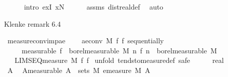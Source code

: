 \begin{isabellebody}
\ \ \ \ \isamarkupfalse%
\ {\isacharparenleft}{\kern0pt}intro\ exI{\isacharbrackleft}{\kern0pt}\ x{\isacharequal}{\kern0pt}N{\isacharbrackright}{\kern0pt}{\isacharparenright}{\kern0pt}\isanewline
\ \ \ \ \isamarkupfalse%
\ assms{\isacharparenleft}{\kern0pt}{}{\isacharparenright}{\kern0pt}\ dist{\isacharunderscore}{\kern0pt}real{\isacharunderscore}{\kern0pt}def\ \isamarkupfalse%
\ auto\isanewline
{}\isamarkupfalse%
%
\endisatagproof
{\isafoldproof}%
%
\isadelimproof
%
\endisadelimproof
%
\begin{isamarkuptext}%
Klenke remark 6.4%
\end{isamarkuptext}\isamarkuptrue%
\isamarkupfalse%
\ measure{\isacharunderscore}{\kern0pt}conv{\isacharunderscore}{\kern0pt}imp{\isacharunderscore}{\kern0pt}ae{\isacharcolon}{\kern0pt}\ \isanewline
\ \ \ {\isachardoublequoteopen}ae{\isacharunderscore}{\kern0pt}conv\ M\ f{\isacharprime}{\kern0pt}\ f\ sequentially{\isachardoublequoteclose}\isanewline
\ \ \ \ \ {\isacharbrackleft}{\kern0pt}measurable{\isacharbrackright}{\kern0pt}{\isacharcolon}{\kern0pt}\ {\isachardoublequoteopen}f\ {\isasymin}\ borel{\isacharunderscore}{\kern0pt}measurable\ M{\isachardoublequoteclose}\ {\isachardoublequoteopen}{\isasymAnd}n{\isachardot}{\kern0pt}\ f{\isacharprime}{\kern0pt}\ n\ {\isasymin}\ borel{\isacharunderscore}{\kern0pt}measurable\ M{\isachardoublequoteclose}\isanewline
\ \ \ {\isachardoublequoteopen}LIMSEQ{\isacharunderscore}{\kern0pt}measure\ M\ f{\isacharprime}{\kern0pt}\ f{\isachardoublequoteclose}\isanewline
%
\isadelimproof
%
\endisadelimproof
%
\isatagproof
{}\isamarkupfalse%
\ {\isacharparenleft}{\kern0pt}unfold\ tendsto{\isacharunderscore}{\kern0pt}measure{\isacharunderscore}{\kern0pt}def{\isacharcomma}{\kern0pt}\ safe{\isacharparenright}{\kern0pt}\isanewline
\ \ \isamarkupfalse%
\ {\isasymepsilon}\ {\isacharcolon}{\kern0pt}{\isacharcolon}{\kern0pt}\ real\ \isamarkupfalse%
\ {\isachardoublequoteopen}{}\ {\isacharless}{\kern0pt}\ {\isasymepsilon}{\isachardoublequoteclose}\isanewline
\ \ \isamarkupfalse%
\ A\ \isamarkupfalse%
\ A{\isacharbrackleft}{\kern0pt}measurable{\isacharbrackright}{\kern0pt}{\isacharcolon}{\kern0pt}\ {\isachardoublequoteopen}A\ {\isasymin}\ sets\ M{\isachardoublequoteclose}\ {\isachardoublequoteopen}emeasure\ M\ A\ {\isasymnoteq}\ {\isasyminfinity}{\isachardoublequoteclose}%

\end{isabellebody}
